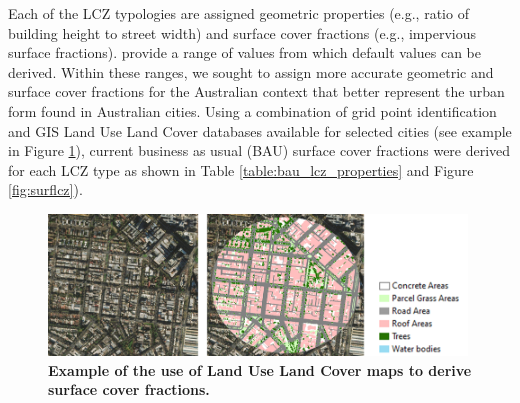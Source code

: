 \documentclass[utf8]{frontiersSCNS} %
\begin{document}
Each of the LCZ typologies are assigned geometric properties (e.g., ratio of building height to street width) and surface cover fractions (e.g., impervious surface fractions). \cite{Stewart2012b} provide a range of values from which default values can be derived. Within these ranges, we sought to assign more accurate geometric and surface cover fractions for the Australian context that better represent the urban form found in Australian cities. Using a combination of grid point identification and GIS Land Use Land Cover databases available for selected cities (see example in Figure \ref{fig:surfCovFrac}), current business as usual (BAU) surface cover fractions were derived for each LCZ type as shown in Table \ref{table:bau_lcz_properties} and Figure \ref{fig:surflcz}).

\begin{figure}[!ht]
\centering
\includegraphics[width=0.99\textwidth]{images/image5.png}
\caption{\bf Example of the use of Land Use Land Cover maps to derive surface cover fractions.}
 \label{fig:surfCovFrac}
\end{figure}
\end{document}
